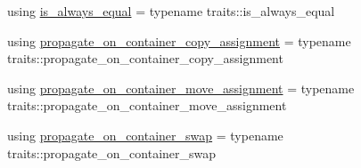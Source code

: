 \begin{DoxyCompactItemize}
\item 
using \hyperlink{structbc_1_1allocators_1_1Allocator__Forwarder_abb86157d20c1e651a750e548a69471b1}{is\+\_\+always\+\_\+equal} = typename traits\+::is\+\_\+always\+\_\+equal
\item 
using \hyperlink{structbc_1_1allocators_1_1Allocator__Forwarder_a3264aaf2ed5a7a49c1f48928e876b447}{propagate\+\_\+on\+\_\+container\+\_\+copy\+\_\+assignment} = typename traits\+::propagate\+\_\+on\+\_\+container\+\_\+copy\+\_\+assignment
\item 
using \hyperlink{structbc_1_1allocators_1_1Allocator__Forwarder_ab20c8fa36659a5ca6702192fdb4bde4e}{propagate\+\_\+on\+\_\+container\+\_\+move\+\_\+assignment} = typename traits\+::propagate\+\_\+on\+\_\+container\+\_\+move\+\_\+assignment
\item 
using \hyperlink{structbc_1_1allocators_1_1Allocator__Forwarder_a243203b0477fbb815757f5267c56da92}{propagate\+\_\+on\+\_\+container\+\_\+swap} = typename traits\+::propagate\+\_\+on\+\_\+container\+\_\+swap
\end{DoxyCompactItemize}
